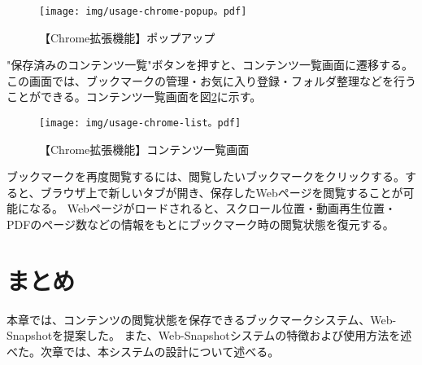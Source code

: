 \begin{figure}[htbp]
  \caption{【Chrome拡張機能】ポップアップ}
  \label{fig:usage-chrome-popup}
  \begin{center}
    \texttt{[image: img/usage-chrome-popup。pdf]}
  \end{center}
\end{figure}

"保存済みのコンテンツ一覧"ボタンを押すと、コンテンツ一覧画面に遷移する。
この画面では、ブックマークの管理・お気に入り登録・フォルダ整理などを行うことができる。コンテンツ一覧画面を図\ref{fig:usage-chrome-list}に示す。

\begin{figure}[htbp]
  \caption{【Chrome拡張機能】コンテンツ一覧画面}
  \label{fig:usage-chrome-list}
  \begin{center}
    \texttt{[image: img/usage-chrome-list。pdf]}
  \end{center}
\end{figure}

ブックマークを再度閲覧するには、閲覧したいブックマークをクリックする。すると、ブラウザ上で新しいタブが開き、保存したWebページを閲覧することが可能になる。
Webページがロードされると、スクロール位置・動画再生位置・PDFのページ数などの情報をもとにブックマーク時の閲覧状態を復元する。

\section{まとめ}
本章では、コンテンツの閲覧状態を保存できるブックマークシステム、Web-Snapshotを提案した。
また、Web-Snapshotシステムの特徴および使用方法を述べた。次章では、本システムの設計について述べる。